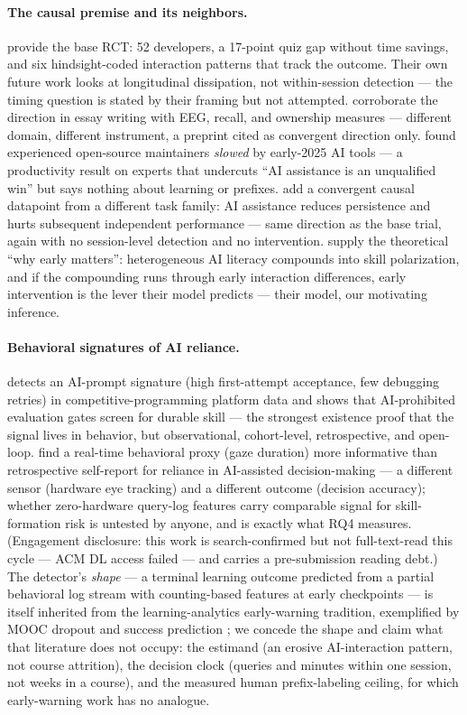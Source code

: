 \documentclass[11pt]{article}
\begin{document}
\paragraph{The causal premise and its neighbors.}
\citet{shen2026skill} provide the base RCT: 52 developers, a 17-point quiz gap without time savings, and six hindsight-coded interaction patterns that track the outcome. Their own future work looks at longitudinal dissipation, not within-session detection --- the timing question is stated by their framing but not attempted. \citet{kosmyna2025brain} corroborate the direction in essay writing with EEG, recall, and ownership measures --- different domain, different instrument, a preprint cited as convergent direction only. \citet{becker2025measuring} found experienced open-source maintainers \emph{slowed} by early-2025 AI tools --- a productivity result on experts that undercuts ``AI assistance is an unqualified win'' but says nothing about learning or prefixes. \citet{liu2026persistence} add a convergent causal datapoint from a different task family: AI assistance reduces persistence and hurts subsequent independent performance --- same direction as the base trial, again with no session-level detection and no intervention. \citet{aouad2026paradox} supply the theoretical ``why early matters'': heterogeneous AI literacy compounds into skill polarization, and if the compounding runs through early interaction differences, early intervention is the lever their model predicts --- their model, our motivating inference.

\paragraph{Behavioral signatures of AI reliance.}
\citet{yao2026scaffold} detects an AI-prompt signature (high first-attempt acceptance, few debugging retries) in competitive-programming platform data and shows that AI-prohibited evaluation gates screen for durable skill --- the strongest existence proof that the signal lives in behavior, but observational, cohort-level, retrospective, and open-loop. \citet{cao2022reliance} find a real-time behavioral proxy (gaze duration) more informative than retrospective self-report for reliance in AI-assisted decision-making --- a different sensor (hardware eye tracking) and a different outcome (decision accuracy); whether zero-hardware query-log features carry comparable signal for skill-formation risk is untested by anyone, and is exactly what RQ4 measures. (Engagement disclosure: this work is search-confirmed but not full-text-read this cycle --- ACM DL access failed --- and carries a pre-submission reading debt.) The detector's \emph{shape} --- a terminal learning outcome predicted from a partial behavioral log stream with counting-based features at early checkpoints --- is itself inherited from the learning-analytics early-warning tradition, exemplified by MOOC dropout and success prediction \citep{gardner2018mooc}; we concede the shape and claim what that literature does not occupy: the estimand (an erosive AI-interaction pattern, not course attrition), the decision clock (queries and minutes within one session, not weeks in a course), and the measured human prefix-labeling ceiling, for which early-warning work has no analogue.
\end{document}
